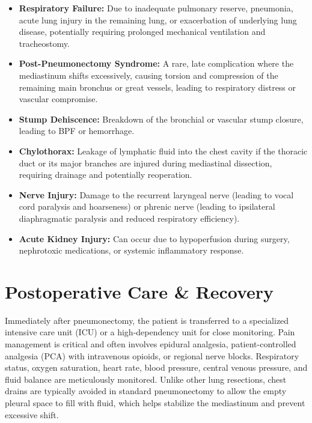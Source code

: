 \begin{itemize}
\begin{itemize}
    \item \textbf{Respiratory Failure:} Due to inadequate pulmonary reserve, pneumonia, acute lung injury in the remaining lung, or exacerbation of underlying lung disease, potentially requiring prolonged mechanical ventilation and tracheostomy.
    
    \item \textbf{Post-Pneumonectomy Syndrome:} A rare, late complication where the mediastinum shifts excessively, causing torsion and compression of the remaining main bronchus or great vessels, leading to respiratory distress or vascular compromise.
    
    \item \textbf{Stump Dehiscence:} Breakdown of the bronchial or vascular stump closure, leading to BPF or hemorrhage.
    
    \item \textbf{Chylothorax:} Leakage of lymphatic fluid into the chest cavity if the thoracic duct or its major branches are injured during mediastinal dissection, requiring drainage and potentially reoperation.
    
    \item \textbf{Nerve Injury:} Damage to the recurrent laryngeal nerve (leading to vocal cord paralysis and hoarseness) or phrenic nerve (leading to ipsilateral diaphragmatic paralysis and reduced respiratory efficiency).
    
    \item \textbf{Acute Kidney Injury:} Can occur due to hypoperfusion during surgery, nephrotoxic medications, or systemic inflammatory response.
  \end{itemize}
\end{itemize}

\section*{Postoperative Care \& Recovery}
Immediately after pneumonectomy, the patient is transferred to a specialized intensive care unit (ICU) or a high-dependency unit for close monitoring. Pain management is critical and often involves epidural analgesia, patient-controlled analgesia (PCA) with intravenous opioids, or regional nerve blocks. Respiratory status, oxygen saturation, heart rate, blood pressure, central venous pressure, and fluid balance are meticulously monitored. Unlike other lung resections, chest drains are typically avoided in standard pneumonectomy to allow the empty pleural space to fill with fluid, which helps stabilize the mediastinum and prevent excessive shift.

